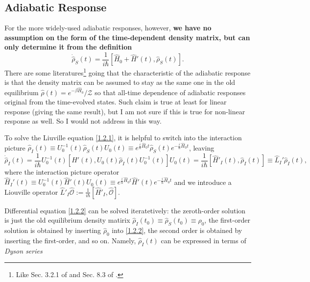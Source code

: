 \documentclass[10pt,nofootinbib,letterpaper]{revtex4}
\newcounter{Note}[section]
\newenvironment{Note}[1][]{{\par\normalfont\bfseries \underline{Note~\stepcounter{Note}\arabic{Note}.}~#1~~}}{\par}
\def\Z{\mathcal{Z}}
\begin{document}
	\subsection{Adiabatic Response}
		For the more widely-used adiabatic responses, however, \textbf{we have no assumption on the form of the time-dependent density matrix, but can only determine it from the definition}
		\begin{equation}\label{1.2.1}
			\dot{\hat\rho}_S(t)=\dfrac{1}{i\hbar}[\hat H_0+\hat H'(t),\hat\rho_S(t)].
		\end{equation}
		\begin{Note}
			There are some literatures\footnote{Like Sec. 3.2.1 of \cite{giuliani2005quantum} and Sec. 8.3 of \cite{levy2000magnetism}.} going that the characteristic of the adiabatic response is that the density matrix can be assumed to stay as the same one in the old equilibrium $\hat\rho(t)=e^{-\beta\hat H_0}/\Z$ so that all-time dependence of adiabatic responses original from the time-evolved states. Such claim is true at least for linear response (giving the same result), but I am not sure if this is true for non-linear response as well. So I would not address in this way.
		\end{Note}
		\hfill\par
		To solve the Liuville equation \eqref{1.2.1}, it is helpful to switch into the interaction picture $\hat\rho_I(t)\equiv U_0^{-1}(t)\hat\rho_S(t)U_0(t)\equiv e^{\frac{i}{\hbar}\hat H_0t}\hat\rho_S(t)e^{-\frac{i}{\hbar}\hat H_0t}$, leaving
		\begin{equation}\label{1.2.2}
			\dot{\hat\rho}_I(t)=\dfrac{1}{i\hbar}U_0^{-1}(t)[\hat H'(t),U_0(t)\hat\rho_I(t)U_0^{-1}(t)]U_0(t)=\dfrac{1}{i\hbar}[\hat H'_I(t),\hat\rho_I(t)]\equiv \hat L_I'\hat\rho_I(t),
		\end{equation}
		where the interaction picture operator $\hat H_I'(t)\equiv U_0^{-1}(t)\hat H'(t)U_0(t)\equiv e^{\frac{i}{\hbar}\hat H_0t}\hat H'(t)e^{-\frac{i}{\hbar}\hat H_0t}$ and we introduce a Liouville operator $\hat L'_I\hat{\mathcal{O}}:=\frac{1}{i\hbar}[\hat H'_I,\hat{\mathcal{O}}]$.\par
		Differential equation \eqref{1.2.2} can be solved iteratetively: the zeroth-order solution is just the old equilibrium density matirix $\hat\rho_I(t_0)\equiv\hat\rho_S(t_0)\equiv\rho_0$, the first-order solution is obtained by inserting $\hat\rho_0$ into \eqref{1.2.2}, the second order is obtained by inserting the first-order, and so on. Namely, $\hat\rho_I(t)$ can be expressed in terms of \emph{Dyson series}
\end{document}
